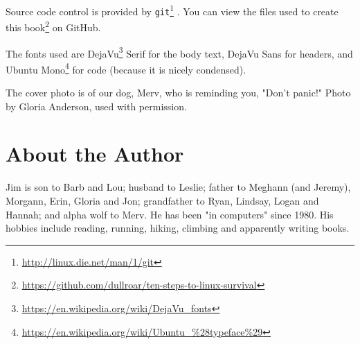 \documentclass[10pt,american,]{book}
\makeatletter
\renewcommand{\href}[2]{#2\footnote{\url{#1}}}
\numberwithin{figure}{chapter}
\DeclareRobustCommand{\drcmd}[1]{
    \index{commands!#1@\texttt{#1}}
}
\makeatother
\begin{document}
Source code control is provided by
\href{http://linux.die.net/man/1/git}{\texttt{git}}\drcmd{git}. You can
view \href{https://github.com/dullroar/ten-steps-to-linux-survival}{the
files used to create this book} on GitHub.

The fonts used are
\href{https://en.wikipedia.org/wiki/DejaVu_fonts}{DejaVu} Serif for the
body text, DejaVu Sans for headers, and
\href{https://en.wikipedia.org/wiki/Ubuntu_\%28typeface\%29}{Ubuntu
Mono} for code (because it is nicely condensed).

The cover photo is of our dog, Merv, who is reminding you, "Don't
panic!" Photo by Gloria Anderson, used with permission.

\section*{About the Author}\label{about-the-author}

Jim is son to Barb and Lou; husband to Leslie; father to Meghann (and
Jeremy), Morgann, Erin, Gloria and Jon; grandfather to Ryan, Lindsay,
Logan and Hannah; and alpha wolf to Merv. He has been "in computers"
since 1980. His hobbies include reading, running, hiking, climbing and
apparently writing books.

\cleardoublepage
{}
\printindex
\end{document}
